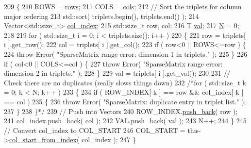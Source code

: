 \begin{DoxyCode}
209   \{
210     ROWS = \hyperlink{classLuna_1_1SparseMatrix_a970319496e5f0b963e4810f2ecbd93b6}{rows};
211     COLS = \hyperlink{classLuna_1_1SparseMatrix_aff9e25ce05b5d11c3490f37fcd2ccfb0}{cols};
212     \textcolor{comment}{// Sort the triplets for column major ordering}
213     std::sort( triplets.begin(), triplets.end() );
214     Vector<std::size\_t> \hyperlink{classLuna_1_1SparseMatrix_ae7f456c12b3075f21b15bb4ee114d8af}{col\_index};
215     std::size\_t row, col;
216     T \hyperlink{classLuna_1_1SparseMatrix_ac22d87e2fb618c6140c579bc72dd503b}{val};
217     \hyperlink{namespaceHeat__plot_a7d050092798e28458a263710837bda77}{N} = 0;
218 
219     \textcolor{keywordflow}{for} ( std::size\_t i = 0; i < triplets.size(); i++ )
220     \{
221       row = triplets[ i ].get\_row();
222       col = triplets[ i ].get\_col();
223       \textcolor{keywordflow}{if} ( row<0 || ROWS<=row ) \{
224         \textcolor{keywordflow}{throw} Error( \textcolor{stringliteral}{"SparseMatrix range error: dimension 1 in triplets."} );
225       \}
226       \textcolor{keywordflow}{if} ( col<0 || COLS<=col ) \{
227         \textcolor{keywordflow}{throw} Error( \textcolor{stringliteral}{"SparseMatrix range error: dimension 2 in triplets."} );
228       \}
229       val = triplets[ i ].get\_val();
230 
231       \textcolor{comment}{// Check there are no duplicates (really slows things down)}
232       \textcolor{comment}{/*for ( std::size\_t k = 0; k < N; k++ )}
233 \textcolor{comment}{      \{}
234 \textcolor{comment}{        if ( ROW\_INDEX[ k ] == row && col\_index[ k ] == col )}
235 \textcolor{comment}{        \{}
236 \textcolor{comment}{          throw Error( "SparseMatrix: duplicate entry in triplet list." );}
237 \textcolor{comment}{        \}}
238 \textcolor{comment}{      \}*/}
239       \textcolor{comment}{// Push into Vectors}
240       ROW\_INDEX.\hyperlink{classLuna_1_1Vector_abf2693db9286f81cf68693fc4fb9fd18}{push\_back}( row );
241       col\_index.push\_back( col );
242       VAL.push\_back( val );
243       \hyperlink{namespaceHeat__plot_a7d050092798e28458a263710837bda77}{N}++;
244     \}
245     \textcolor{comment}{// Convert col\_index to COL\_START}
246     COL\_START = this->\hyperlink{classLuna_1_1SparseMatrix_aff245e8e7b0609dd7dc5c2a533c43c87}{col\_start\_from\_index}( col\_index );
247   \}
\end{DoxyCode}
\mbox{\label{classLuna_1_1SparseMatrix_a06f2dbd99a7fb6c37f4bacdd886bf411}} 
